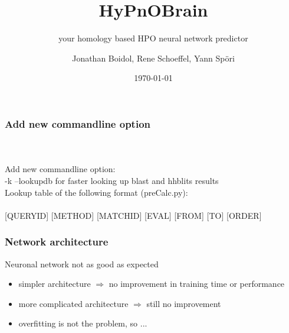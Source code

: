 \documentclass{beamer}
\author{Jonathan Boidol, Rene Schoeffel, Yann Sp\"ori}
\title{HyPnOBrain}
\subtitle{your homology based HPO neural network predictor}
\date{\today}
\begin{document}
\begin{frame}
\maketitle
 
\end{frame}

\begin{frame}
  \frametitle{Add new commandline option}
     ~\\~\\
     Add new commandline option:\\
     -k \vspace{10 mm} --lookupdb\vspace{10 mm} for faster looking up blast and hhblits results\\
     Lookup table of the following format (preCalc.py):\\~\\
     {[}QUERYID{]}\newline
     \vspace{10 mm} {[}METHOD{]} \vspace{10 mm} {[}MATCHID{]} \vspace{10 mm} {[}EVAL{]} \vspace{10 mm} {[}FROM{]} \vspace{10 mm} {[}TO{]} \vspace{10 mm} {[}ORDER{]}
\end{frame}

\begin{frame}
  \frametitle{Network architecture}
  Neuronal network not as good as expected
  \begin{itemize}
    \item simpler architecture $\Rightarrow$ no improvement in training time or performance
    \item more complicated architecture $\Rightarrow$ still no improvement
    \item overfitting is not the problem, so ...
  \end{itemize}
\end{frame}
\end{document}
